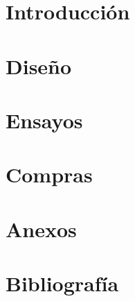 \documentclass[12pt,oneside,final]{rf2}
\begin{document}





\newpage
{}

\tableofcontents

\listoffigures

\listoftables
\newpage
\startarabicpagination

\part{Introducción}


\part{Diseño}




\part{Ensayos}

\part{Compras}




\part{Anexos}
\appendix




\part{Bibliografía}


\end{document}
